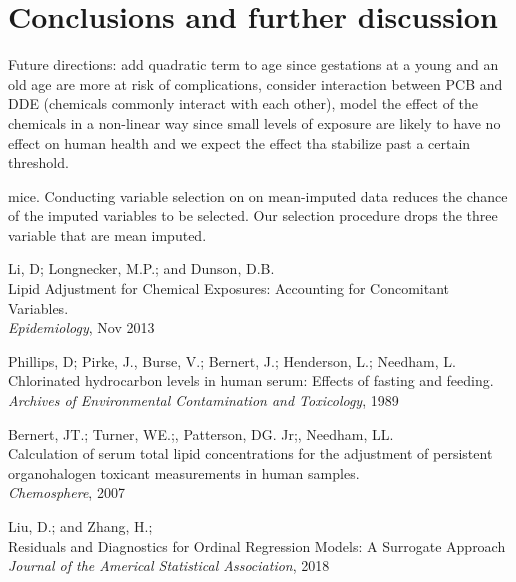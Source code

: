 \documentclass[10pt]{jmlr}%
\begin{document}
\section{Conclusions and further discussion}
\label{sec:conclusion}

Future directions: add quadratic term to age since gestations at a young and an old age are more at risk of complications, consider interaction between PCB and DDE (chemicals commonly interact with each other), model the effect of the chemicals in a non-linear way since small levels of exposure are likely to have no effect on human health and we expect the effect tha stabilize past a certain threshold.

mice. Conducting variable selection on on mean-imputed data reduces the chance of the imputed variables to be selected. Our selection procedure drops the three variable that are mean imputed.


\newpage %
\begin{thebibliography}{99} %
	
	 Li, D; Longnecker, M.P.; and Dunson, D.B. \\
	\newblock Lipid Adjustment for Chemical Exposures: Accounting for Concomitant Variables.\\
	\newblock \emph{Epidemiology}, Nov 2013
	
	 Phillips, D; Pirke, J., Burse, V.; Bernert, J.; Henderson, L.; Needham, L.\\
	\newblock Chlorinated hydrocarbon levels in human serum: Effects of fasting and feeding.\\
	\newblock \emph{Archives of Environmental Contamination and Toxicology}, 1989
	
	 Bernert, JT.; Turner, WE.;, Patterson, DG. Jr;, Needham, LL.\\
	\newblock Calculation of serum total lipid concentrations for the adjustment of persistent organohalogen toxicant measurements in human samples.\\
	\newblock \emph{Chemosphere}, 2007
	
	 Liu, D.; and Zhang, H.;\\
	\newblock Residuals and Diagnostics for Ordinal Regression Models: A Surrogate Approach\\
	\newblock \emph{Journal of the Americal Statistical Association}, 2018
	
\end{thebibliography}
\end{document}
